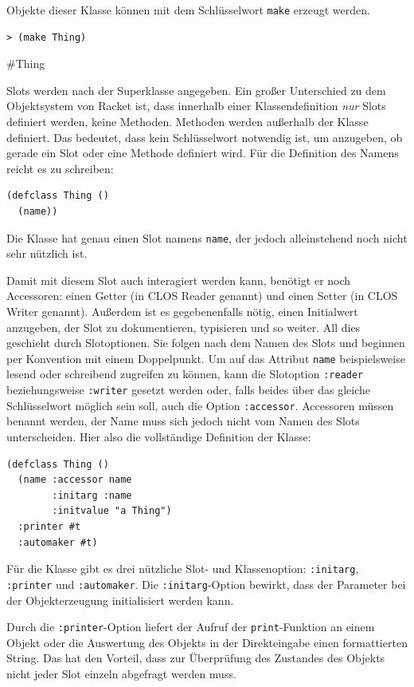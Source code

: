 Objekte dieser Klasse können mit dem Schlüsselwort \texttt{make} erzeugt werden.

\begin{lstlisting}
> (make Thing)
\end{lstlisting}
{\routput \#Thing}

Slots werden nach der Superklasse angegeben. Ein großer Unterschied zu dem Objektsystem von Racket ist, dass innerhalb einer Klassendefinition \textit{nur} Slots definiert werden, keine Methoden. Methoden werden außerhalb der Klasse definiert. Das bedeutet, dass kein Schlüsselwort notwendig ist, um anzugeben, ob gerade ein Slot oder eine Methode definiert wird. Für die Definition des Namens reicht es zu schreiben:

\begin{lstlisting}
(defclass Thing ()
  (name))
\end{lstlisting}

Die Klasse hat genau einen Slot namens \texttt{name}, der jedoch alleinstehend noch nicht sehr nützlich ist.

Damit mit diesem Slot auch interagiert werden kann, benötigt er noch Accessoren: einen Getter (in CLOS Reader genannt) und einen Setter (in CLOS Writer genannt). Außerdem  ist es gegebenenfalls nötig, einen Initialwert anzugeben, der Slot zu dokumentieren, typisieren und so weiter. All dies geschieht durch Slotoptionen. Sie folgen nach dem Namen des Slots und beginnen per Konvention mit einem Doppelpunkt. Um auf das Attribut \texttt{name} beispielsweise lesend oder schreibend zugreifen zu können, kann die Slotoption \texttt{:reader} beziehungsweise \texttt{:writer} gesetzt werden oder, falls beides über das gleiche Schlüsselwort möglich sein soll, auch die Option \texttt{:accessor}. Accessoren müssen benannt werden, der Name muss sich jedoch nicht vom Namen des Slots unterscheiden. Hier also die vollständige Definition der Klasse:

\begin{lstlisting}
(defclass Thing ()
  (name :accessor name
        :initarg :name
        :initvalue "a Thing")
  :printer #t
  :automaker #t)
\end{lstlisting}

Für die Klasse gibt es drei nützliche Slot- und Klassenoption: \texttt{:initarg}, \texttt{:printer} und \texttt{:automaker}. Die \texttt{:initarg}-Option bewirkt, dass der Parameter bei der Objekterzeugung initialisiert werden kann.

Durch die \texttt{:printer}-Option liefert der Aufruf der \texttt{print}-Funktion an einem Objekt oder die Auswertung des Objekts in der Direkteingabe einen formattierten String. Das hat den Vorteil, dass zur Überprüfung des Zustandes des Objekts nicht jeder Slot einzeln abgefragt werden muss.

